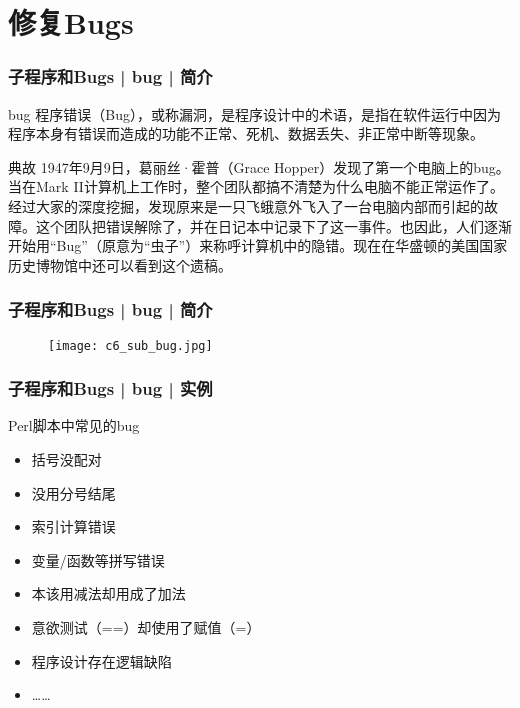 \section{修复Bugs}
\begin{frame}
  \frametitle{子程序和Bugs | bug | 简介}
  \begin{block}{bug}
程序错误（Bug），或称漏洞，是程序设计中的术语，是指在软件运行中因为程序本身有错误而造成的功能不正常、死机、数据丢失、非正常中断等现象。
  \end{block}
  \pause
  \begin{block}{典故}
    1947年9月9日，葛丽丝·霍普（Grace Hopper）发现了第一个电脑上的bug。当在Mark II计算机上工作时，整个团队都搞不清楚为什么电脑不能正常运作了。经过大家的深度挖掘，发现原来是一只飞蛾意外飞入了一台电脑内部而引起的故障。这个团队把错误解除了，并在日记本中记录下了这一事件。也因此，人们逐渐开始用“Bug”（原意为“虫子”）来称呼计算机中的隐错。现在在华盛顿的美国国家历史博物馆中还可以看到这个遗稿。
  \end{block}
\end{frame}

\begin{frame}
  \frametitle{子程序和Bugs | bug | 简介}
  \begin{figure}
    \centering
    \texttt{[image: c6\_sub\_bug.jpg]}
  \end{figure}
\end{frame}

\begin{frame}
  \frametitle{子程序和Bugs | bug | \alert{实例}}
  \begin{block}{Perl脚本中常见的bug}
    \begin{itemize}
      \item 括号没配对
      \item 没用分号结尾
      \item 索引计算错误
      \item 变量/函数等拼写错误
      \item 本该用减法却用成了加法
      \item 意欲测试（==）却使用了赋值（=）
      \item 程序设计存在逻辑缺陷
      \item ……
    \end{itemize}
  \end{block}
\end{frame}

